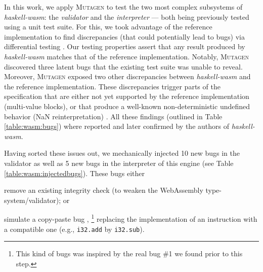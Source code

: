 \documentclass[sigconf,review,anonymous]{acmart}
\newcommand{\mutagen}{\textsc{Mutagen}\xspace}
\begin{document}
In this work, we apply \mutagen to test the two most complex subsystems of
\textit{haskell-wasm}: the \emph{validator} and the \emph{interpreter} --- both
being previously tested using a unit test suite.
%
%
For this, we took advantage of the reference implementation to find
discrepancies (that could potentially lead to bugs) via differential testing
\cite{mckeeman1998differential}.
%
Our testing properties assert that any result produced by \textit{haskell-wasm}
matches that of the reference implementation.
%
Notably, \mutagen discovered three latent bugs 
that the existing test suite was unable to reveal.
%
%
Moreover, \mutagen exposed two other discrepancies between \textit{haskell-wasm}
and the reference implementation.
%
These discrepancies trigger parts of the specification that are either not yet
supported by the reference implementation (multi-value blocks), or that produce
a well-known non-deterministic undefined behavior (NaN reinterpretation)
\cite{perenyi2020stack}.
%
All these findings (outlined in Table \ref{table:wasm:bugs}) where reported and
later confirmed by the authors of \textit{haskell-wasm}.
%


Having sorted these issues out, we mechanically injected 10 new bugs in the
validator as well as 5 new bugs in the interpreter of this engine (see Table
\ref{table:wasm:injectedbugs}).
%
These bugs either
%
\begin{inparaenum}
\item remove an existing integrity check (to weaken the WebAssembly
  type-system/validator); or
\item simulate a copy-paste bug \cite{CPMiner},%
  \footnote{This kind of bugs was inspired by the real bug \#1 we found prior to
    this step.}
  replacing the implementation of an instruction with a compatible one
  (e.g., \texttt{i32.add} by \texttt{i32.sub}).
\end{inparaenum}




\end{document}
